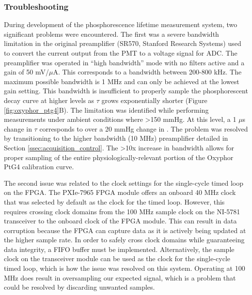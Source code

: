 \subsubsection{Troubleshooting}

During development of the phosphorescence lifetime measurement system, two significant problems were encountered. The first was a severe bandwidth limitation in the original preamplifier (SR570, Stanford Research Systems) used to convert the current output from the PMT to a voltage signal for ADC. The preamplifier was operated in “high bandwidth” mode with no filters active and a gain of 50 mV/$\mu$A. This corresponds to a bandwidth between 200-800 kHz. The maximum possible bandwidth is 1 MHz and can only be achieved at the lowest gain setting. This bandwidth is insufficient to properly sample the phosphorescent decay curve at higher  levels as $\tau$ grows exponentially shorter (Figure \ref{fig:oxyphor_ptg4}B). The limitation was identified while performing measurements under ambient conditions where  \textgreater 150 mmHg. At this  level, a 1 $\mu$s change in $\tau$ corresponds to over a 20 mmHg change in . The problem was resolved by transitioning to the higher bandwidth (10 MHz) preamplifier detailed in Section \ref{ssec:acquisition_control}. The \textgreater 10x increase in bandwidth allows for proper sampling of the entire physiologically-relevant portion of the Oxyphor PtG4 calibration curve.

The second issue was related to the clock settings for the single-cycle timed loop on the FPGA. The PXIe-7965 FPGA module offers an onboard 40 MHz clock that was selected by default as the clock for the timed loop. However, this requires crossing clock domains from the 100 MHz sample clock on the NI-5781 transceiver to the onboard clock of the FPGA module. This can result in data corruption because the FPGA can capture data as it is actively being updated at the higher sample rate. In order to safely cross clock domains while guaranteeing data integrity, a FIFO buffer must be implemented. Alternatively, the sample clock on the transceiver module can be used as the clock for the single-cycle timed loop, which is how the issue was resolved on this system. Operating at 100 MHz does result in oversampling our expected signal, which is a problem that could be resolved by discarding unwanted samples.


